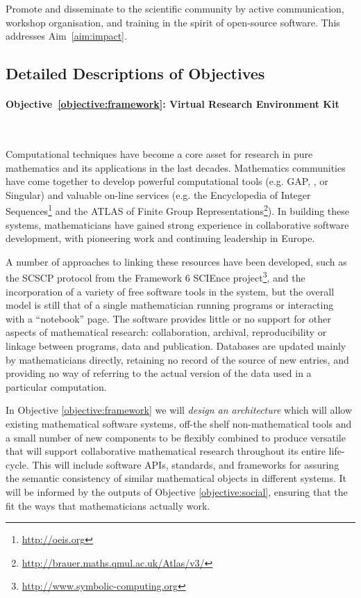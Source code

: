 \documentclass[noworkareas,deliverables,\classoptions]{euproposal}       %
\begin{document}
\begin{proposal}
\begin{compactenum}
\item \label{objective:disseminate} Promote and disseminate
  \TheProject to the scientific community by active communication,
  workshop organisation, and training in the spirit of open-source
  software. This addresses Aim~\ref{aim:impact}.


\end{compactenum}

\subsection*{Detailed Descriptions of Objectives} %

\paragraph{Objective~\ref{objective:framework}: Virtual Research
  Environment Kit}\

Computational techniques have become a core asset for research in pure
mathematics and its applications in the last decades. Mathematics
communities have come together to develop powerful computational
tools (e.g. GAP, \PariGP, \Sage or Singular) and valuable on-line
services (e.g. the Encyclopedia of Integer Sequences\footnote{\url{http://oeis.org}} and the ATLAS of Finite Group Representations\footnote{
\url{http://brauer.maths.qmul.ac.uk/Atlas/v3/}}). In building these
systems, mathematicians have gained strong experience in collaborative
software development, with pioneering work and continuing leadership
in Europe.

A number of approaches to linking these resources have been developed,
such as the SCSCP protocol from the Framework 6 SCIEnce
project\footnote{\url{http://www.symbolic-computing.org}}, and the
incorporation of a variety of free software tools in the \Sage system,
but the overall model is still that of a single mathematician running
programs or interacting with a ``notebook'' page. The software
provides little or no support for other aspects of mathematical
research: collaboration, archival, reproducibility or linkage between
programs, data and publication. Databases are updated mainly by
mathematicians directly, retaining no record of the source of new
entries, and providing no way of referring to the actual version of
the data used in a particular computation.

In Objective \ref{objective:framework} we will \emph{design an
  architecture} which will allow existing mathematical software
systems, off-the shelf non-mathematical tools and a small number of new
components to be flexibly combined to produce versatile \VREs that will support
collaborative mathematical research throughout its entire
life-cycle. This will include software APIs, standards, and
frameworks for assuring the semantic consistency of similar
mathematical objects in different systems. It will be informed by the
outputs of Objective \ref{objective:social}, ensuring that the \VREs
fit the ways that mathematicians actually work.


\end{proposal}
\end{document}
